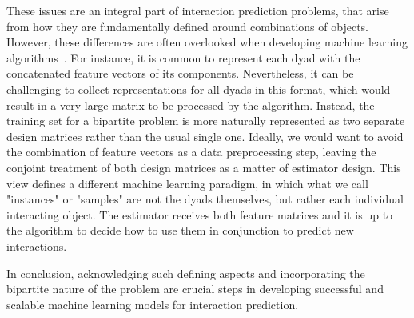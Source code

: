 These issues are an integral part of interaction prediction problems,
that arise from how they are fundamentally defined around combinations of objects.
%
However, these differences are often overlooked when developing machine learning algorithms~\cite{pahikkala2015more}.
%
For instance, it is common to represent each dyad with the concatenated feature vectors of its components. Nevertheless, it can be challenging to collect representations for all dyads in this format, which would result in a very large matrix to be processed by the algorithm.
%
Instead, the training set for a bipartite problem is more naturally represented as two separate design matrices rather than the usual single one.
Ideally, we would want to avoid the combination of feature vectors as a data preprocessing step, leaving the conjoint treatment of both design matrices as a matter of estimator design. This view defines a different machine learning paradigm, in which what we call "instances" or "samples" are not the dyads themselves, but rather each individual interacting object. The estimator receives both feature matrices and it is up to the algorithm to decide how to use them in conjunction to predict new interactions.


In conclusion, acknowledging such defining aspects and incorporating the bipartite nature of the problem are crucial steps in developing successful and scalable machine learning models for interaction prediction.

